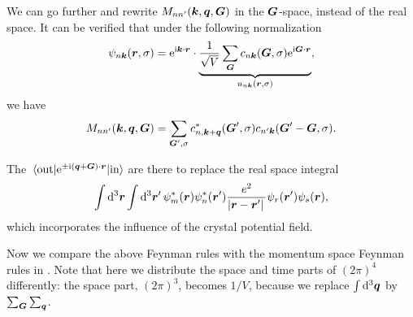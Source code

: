 \documentclass[hyperref, a4paper, 12pt]{report}
\newcommand*{\ii}{\mathrm{i}}
\newcommand*{\ee}{\mathrm{e}}
\begin{document}
\begin{itemize}
    We can go further and rewrite $M_{n n'}(\vb*{k}, \vb*{q}, \vb*{G})$ 
    in the $\vb*{G}$-space, instead of the real space. 
    It can be verified that under the following normalization 
    \begin{equation}
        \psi_{n \vb*{k}}(\vb*{r}, \sigma) = \ee^{\ii \vb*{k} \cdot \vb*{r}} \cdot 
        \underbrace{
            \frac{1}{\sqrt{V}} \sum_{\vb*{G}} c_{n \vb*{k}}(\vb*{G}, \sigma) \ee^{\ii \vb*{G} \cdot \vb*{r}}
        }_{u_{n \vb*{k}}(\vb*{r}, \sigma)} , 
    \end{equation}
    we have 
    \begin{equation}
        M_{n n'}(\vb*{k}, \vb*{q}, \vb*{G}) = 
        \sum_{\vb*{G}', \sigma} 
        c^*_{n, \vb*{k} + \vb*{q}}(\vb*{G}', \sigma) 
        c_{n' \vb*{k}} (\vb*{G}' - \vb*{G}, \sigma).
    \end{equation}
\end{itemize}

The $\mel*{\text{out}}{\ee^{\pm \ii (\vb*{q} + \vb*{G}) \cdot \vb*{r}}}{\text{in}}$
are there to replace the real space integral 
\[
    \int \dd[3]{\vb*{r}} \int \dd[3]{\vb*{r}'} 
    \psi_m^*(\vb*{r}) \psi^*_{n}(\vb*{r}')
    \frac{e^2}{\abs*{\vb*{r} - \vb*{r}'}}
    \psi_r(\vb*{r}') \psi_s(\vb*{r}),
\]
which incorporates the influence of the crystal potential field.

Now we compare the above Feynman rules with 
the momentum space Feynman rules in .
Note that here we distribute the space and time parts of $(2\pi)^4$ differently:
the space part, $(2\pi)^3$,
becomes $1/V$, because we replace $\int \dd[3]{\vb*{q}}$ by $\sum_{\vb*{G}} \sum_{\vb*{q}}$.
\end{document}
